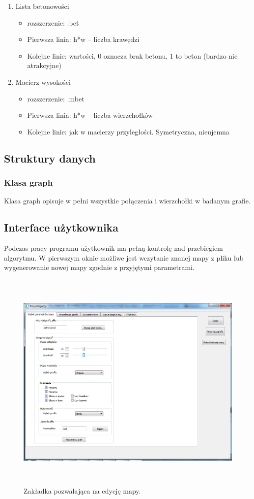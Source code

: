 \documentclass[12pt,a4paper]{article}
\begin{document}
\begin{enumerate}
\begin{itemize}
	\end{itemize}
\item Lista betonowości
	\begin{itemize}
	\item rozszerzenie: .bet
	\item Pierwsza linia: h*w -- liczba krawędzi
	\item Kolejne linie: wartości, 0 oznacza brak betonu, 1 to beton (bardzo nie atrakcyjne)
	\end{itemize}
\item Macierz wysokości
	\begin{itemize}
	\item rozszerzenie: .mbet
	\item Pierwsza linia: h*w -- liczba wierzchołków
	\item Kolejne linie: jak w macierzy przyległości. Symetryczna, nieujemna
	\end{itemize}				
\end{enumerate}

\subsection{Struktury danych}
\subsubsection{Klasa graph}
Klasa graph opisuje w pełni wszystkie połączenia i wierzchołki w badanym grafie.

\subsection{Interface użytkownika}
Podczas pracy programu użytkownik ma pełną kontrolę nad przebiegiem algorytmu. W pierwszym oknie możliwe jest wczytanie znanej mapy z pliku lub wygenerowanie nowej mapy zgodnie z przyjętymi parametrami.
\begin{figure}[!h]
	\centering
	\includegraphics[height=110mm]{./ilustracje/screen1.png}
	\caption{Zakładka pozwalająca na edycję mapy.}
\end{figure}
\end{document}
